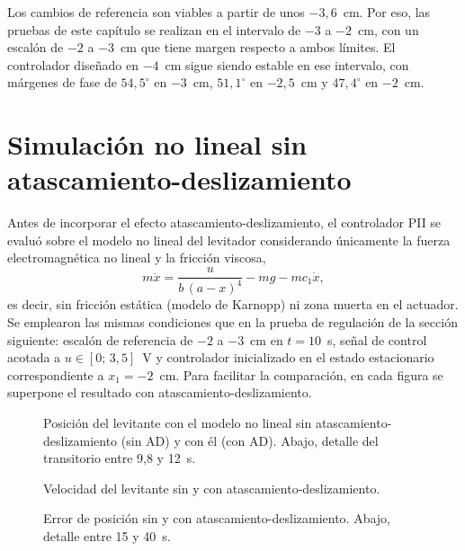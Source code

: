 Los cambios de referencia son viables a partir de unos $-3{,}6$~cm. Por eso, las pruebas de este capítulo se realizan en el intervalo de $-3$ a $-2$~cm, con un escalón de $-2$ a $-3$~cm que tiene margen respecto a ambos límites. El controlador diseñado en $-4$~cm sigue siendo estable en ese intervalo, con márgenes de fase de $54{,}5^\circ$ en $-3$~cm, $51{,}1^\circ$ en $-2{,}5$~cm y $47{,}4^\circ$ en $-2$~cm.

\section{Simulación no lineal sin atascamiento-deslizamiento}

Antes de incorporar el efecto atascamiento-deslizamiento, el controlador PII se evaluó sobre el modelo no lineal del levitador considerando únicamente la fuerza electromagnética no lineal y la fricción viscosa,
\[
m\ddot{x} = \frac{u}{b\,(a-x)^4} - m g - m c_1 \dot{x},
\]
es decir, sin fricción estática (modelo de Karnopp) ni zona muerta en el actuador. Se emplearon las mismas condiciones que en la prueba de regulación de la sección siguiente: escalón de referencia de $-2$ a $-3$~cm en $t=10$~s, señal de control acotada a $u\in[0;\,3{,}5]$~V y controlador inicializado en el estado estacionario correspondiente a $x_1=-2$~cm. Para facilitar la comparación, en cada figura se superpone el resultado con atascamiento-deslizamiento.

\begin{figure}[ht]
    \centering
    
    \caption[Sin AD: posición]{Posición del levitante con el modelo no lineal sin atascamiento-deslizamiento (sin AD) y con él (con AD). Abajo, detalle del transitorio entre 9,8 y 12~s.}
    \label{fig:sinad_pos}
\end{figure}

\begin{figure}[ht]
    \centering
    
    \caption[Sin AD: velocidad]{Velocidad del levitante sin y con atascamiento-deslizamiento.}
    \label{fig:sinad_vel}
\end{figure}

\begin{figure}[ht]
    \centering
    
    \caption[Sin AD: error]{Error de posición sin y con atascamiento-deslizamiento. Abajo, detalle entre 15 y 40~s.}
    \label{fig:sinad_error}
\end{figure}

